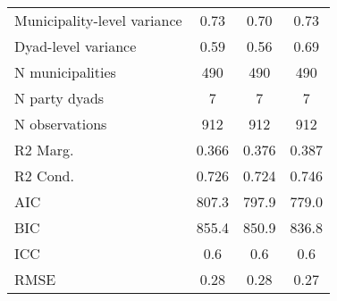\begin{tabular}[t]{lccc}
\midrule
Municipality-level variance             & \num{0.73}     & \num{0.70}     & \num{0.73}     \\
Dyad-level variance                     & \num{0.59}     & \num{0.56}     & \num{0.69}     \\
N municipalities                        & \num{490}   & \num{490}   & \num{490}   \\
N party dyads                           & \num{7}     & \num{7}     & \num{7}     \\
N observations                          & \num{912}      & \num{912}      & \num{912}      \\
R2 Marg.                                & \num{0.366}    & \num{0.376}    & \num{0.387}    \\
R2 Cond.                                & \num{0.726}    & \num{0.724}    & \num{0.746}    \\
AIC                                     & \num{807.3}    & \num{797.9}    & \num{779.0}    \\
BIC                                     & \num{855.4}    & \num{850.9}    & \num{836.8}    \\
ICC                                     & \num{0.6}      & \num{0.6}      & \num{0.6}      \\
RMSE                                    & \num{0.28}     & \num{0.28}     & \num{0.27}     \\
\bottomrule
\end{tabular}
